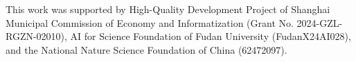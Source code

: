 \begin{ack}
This work was supported by High-Quality Development Project of Shanghai Municipal Commission of Economy and Informatization (Grant No. 2024-GZL-RGZN-02010), AI for Science Foundation of Fudan University (FudanX24AI028), and the National Nature Science Foundation of China (62472097).
\end{ack}
